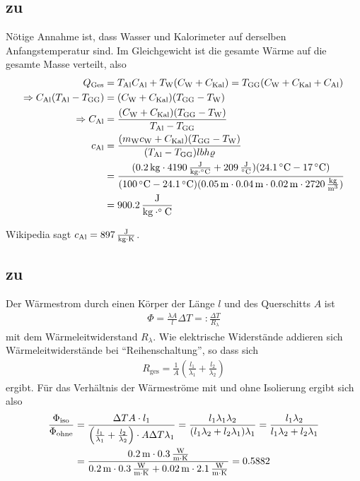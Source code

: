 \documentclass[a4paper]{scrartcl}
\begin{document}
\subsection{zu }
\label{lsg:Waermekap}
Nötige Annahme ist, dass Wasser und Kalorimeter auf derselben Anfangstemperatur sind. Im Gleichgewicht ist die gesamte Wärme auf die gesamte Masse verteilt, also
\begin{align*}
  Q_\text{Ges} & = T_\text{Al}C_\text{Al} + T_\text{W}(C_\text{W} + C_\text{Kal}) = T_\text{GG}(C_\text{W} + C_\text{Kal} + C_\text{Al}) \\
  \Rightarrow C_\text{Al} (T_\text{Al} - T_\text{GG}) & = (C_\text{W} + C_\text{Kal})(T_\text{GG} - T_\text{W})\\
  \Rightarrow C_\text{Al}& = \frac{(C_\text{W} + C_\text{Kal})(T_\text{GG} - T_\text{W})}{T_\text{Al} - T_\text{GG}} \\
  c_\text{Al} & = \frac{(m_\text{W}c_\text{W}+ C_\text{Kal})(T_\text{GG} - T_\text{W})}{(T_\text{Al} - T_\text{GG}) lbh \varrho} \\
  &= \frac{(\unit[0.2]{kg} \cdot \unit[4190]{\frac{J}{kg \cdot ^\circ C} + \unit[209]{\frac{J}{^\circ C})(\unit[24.1]{^\circ C} - \unit[17]{^\circ C})}}}{(\unit[100]{^\circ C} - \unit[24.1]{^\circ C})(\unit[0.05]{m} \cdot \unit[0.04]{m} \cdot\unit[0.02]{m} \cdot \unit[2720]{\frac{kg}{m^3}})} \\
  &= \unit[900.2]{\frac{J}{kg\cdot ^\circ C}}
\end{align*}

Wikipedia sagt $c_\text{Al} = \unit[897]{\frac{J}{kg\cdot K}}$.

\subsection{zu }
\label{lsg:Waermeleitung}

Der Wärmestrom durch einen Körper der Länge $l$ und des Querschitts $A$ ist
\begin{align*}
  \Phi = \frac{\lambda A}{l}\Delta T =: \frac{\Delta T}{R_\lambda}
\end{align*} mit dem Wärmeleitwiderstand $R_\lambda$. Wie elektrische Widerstände addieren sich Wärmeleitwiderstände bei "`Reihenschaltung"', so dass sich
\begin{align*}
  R_\text{ges} = \frac{1}{A} \left( \frac{l_1}{\lambda_1} + \frac{l_2}{\lambda_2}\right)
\end{align*} ergibt. Für das Verhältnis der Wärmeströme mit und ohne Isolierung ergibt sich also
\begin{align*}
  \frac{\Phi_\text{iso}}{\Phi_\text{ohne}} & = \frac{\Delta T A \cdot l_1}{\left( \frac{l_1}{\lambda_1} + \frac{l_2}{\lambda_2} \right) \cdot A\Delta T  \lambda_1} = \frac{l_1 \lambda_1\lambda_2}{(l_1\lambda_2 + l_2\lambda_1)\lambda_1} = \frac{l_1\lambda_2}{l_1\lambda_2 + l_2\lambda_1} \\
  & = \frac{\unit[0.2]{m} \cdot \unit[0.3]{\frac{W}{m\cdot K}}}{\unit[0.2]{m} \cdot \unit[0.3]{\frac{W}{m\cdot K}} + \unit[0.02]{m} \cdot \unit[2.1]{\frac{W}{m\cdot K}}} = 0.5882
\end{align*}
\end{document}
